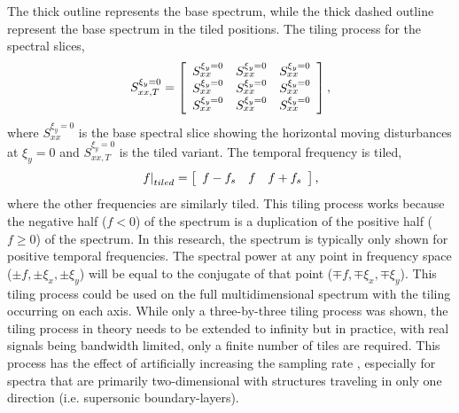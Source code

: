 The thick outline represents the base spectrum, while the thick dashed outline represent the base spectrum in the tiled positions.
The tiling process for the spectral slices,
\begin{equation}
  S_{xx,T}^{\xi_y=0} = \left[
    \begin{array}{c c c}
      S_{xx}^{\xi_y=0} & S_{xx}^{\xi_y=0} & S_{xx}^{\xi_y=0} \\
      S_{xx}^{\xi_y=0} & S_{xx}^{\xi_y=0} & S_{xx}^{\xi_y=0} \\
      S_{xx}^{\xi_y=0} & S_{xx}^{\xi_y=0} & S_{xx}^{\xi_y=0}
    \end{array}
  \right] \textrm{,}
\end{equation}
where $S_{xx}^{\xi_y=0}$ is the base spectral slice showing the horizontal moving disturbances at $\xi_y=0$ and $S_{xx,T}^{\xi_y=0}$ is the tiled variant.
The temporal frequency is tiled,
\begin{equation}
  \left. f\right|_{tiled} = \left[
    \begin{array}{c c c}
      f-f_s & f & f+f_s
    \end{array}
  \right] \textrm{,}
\end{equation}
where the other frequencies are similarly tiled.
This tiling process works because the negative half ($f<0$) of the spectrum is a duplication of the positive half ($f\ge0$) of the spectrum.
In this research, the spectrum is typically only shown for positive temporal frequencies.
The spectral power at any point in frequency space ($\pm f,\pm\xi_x,\pm\xi_y$) will be equal to the conjugate of that point ($\mp f,\mp\xi_x,\mp\xi_y$).
This tiling process could be used on the full multidimensional spectrum with the tiling occurring on each axis.
While only a three-by-three tiling process was shown, the tiling process in theory needs to be extended to infinity but in practice, with real signals being bandwidth limited, only a finite number of tiles are required.
This process has the effect of artificially increasing the sampling rate \cite{Lynch-2021-DygYkEGU}, especially for spectra that are primarily two-dimensional with structures traveling in only one direction (i.e. supersonic boundary-layers).

